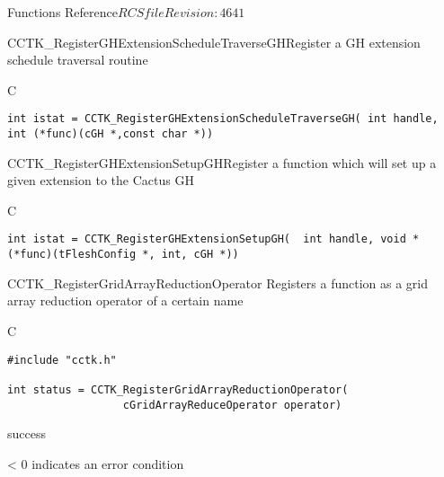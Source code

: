 \begin{cactuspart}{ Functions Reference}{$RCSfile$}{$Revision: 4641 $}
\begin{FunctionDescription}{CCTK\_RegisterGHExtensionScheduleTraverseGH}{Register a GH extension schedule traversal routine}
\label{CCTK-RegisterGHExtensionScheduleTraverseGH}
\begin{SynopsisSection}
\begin{Synopsis}{C}
\begin{verbatim}int istat = CCTK_RegisterGHExtensionScheduleTraverseGH( int handle, int (*func)(cGH *,const char *))\end{verbatim}
\end{Synopsis}
\end{SynopsisSection}
\end{FunctionDescription}

\begin{FunctionDescription}{CCTK\_RegisterGHExtensionSetupGH}{Register a function which will set up a given extension to the Cactus GH}
\label{CCTK-RegisterGHExtensionSetupGH}
\begin{SynopsisSection}
\begin{Synopsis}{C}
\begin{verbatim}int istat = CCTK_RegisterGHExtensionSetupGH(  int handle, void * (*func)(tFleshConfig *, int, cGH *))\end{verbatim}
\end{Synopsis}
\end{SynopsisSection}
\end{FunctionDescription}

\begin{FunctionDescription}{CCTK\_RegisterGridArrayReductionOperator}
\label{CCTK-RegisterGridArrayReductionOperator}
Registers a function as a grid array reduction operator of a certain name

\begin{SynopsisSection}
\begin{Synopsis}{C}
\begin{verbatim}
#include "cctk.h"

int status = CCTK_RegisterGridArrayReductionOperator(
                  cGridArrayReduceOperator operator)
\end{verbatim}
\end{Synopsis}
\end{SynopsisSection}

\begin{ResultSection}
\begin{Result}{0} success \end{Result}
\begin{Result}{< 0} indicates an error condition \end{Result}
\end{ResultSection}


\end{FunctionDescription}
\end{cactuspart}
